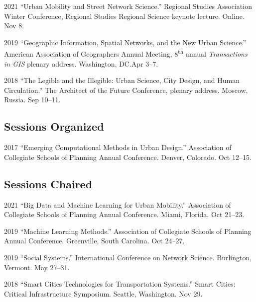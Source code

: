 \documentclass[12pt,letterpaper]{report}
\begin{document}
    \begin{tablist}

        \item[2021] \tab{}\enquote{Urban Mobility and Street Network Science.} Regional Studies Association Winter Conference, Regional Studies Regional Science keynote lecture. Online. Nov 8.

        \item[2019] \tab{}\enquote{Geographic Information, Spatial Networks, and the New Urban Science.} American Association of Geographers Annual Meeting, 8\textsuperscript{th} annual \textit{Transactions in GIS} plenary address. Washington, DC.\@ Apr 3--7.

        \item[2018] \tab{}\enquote{The Legible and the Illegible: Urban Science, City Design, and Human Circulation.} The Architect of the Future Conference, plenary address. Moscow, Russia. Sep 10--11.

    \end{tablist}

    \subsection*{Sessions Organized}

    \begin{tablist}

        \item[2017] \tab{}\enquote{Emerging Computational Methods in Urban Design.} Association of Collegiate Schools of Planning Annual Conference. Denver, Colorado. Oct 12--15.

    \end{tablist}

    \subsection*{Sessions Chaired}

    \begin{tablist}

        \item[2021] \tab{}\enquote{Big Data and Machine Learning for Urban Mobility.} Association of Collegiate Schools of Planning Annual Conference. Miami, Florida. Oct 21--23.

        \item[2019] \tab{}\enquote{Machine Learning Methods.} Association of Collegiate Schools of Planning Annual Conference. Greenville, South Carolina. Oct 24--27.

        \item[2019] \tab{}\enquote{Social Systems.} International Conference on Network Science. Burlington, Vermont. May 27--31.

        \item[2018] \tab{}\enquote{Smart Cities Technologies for Transportation Systems.} Smart Cities: Critical Infrastructure Symposium. Seattle, Washington. Nov 29.

    \end{tablist}
\end{document}
